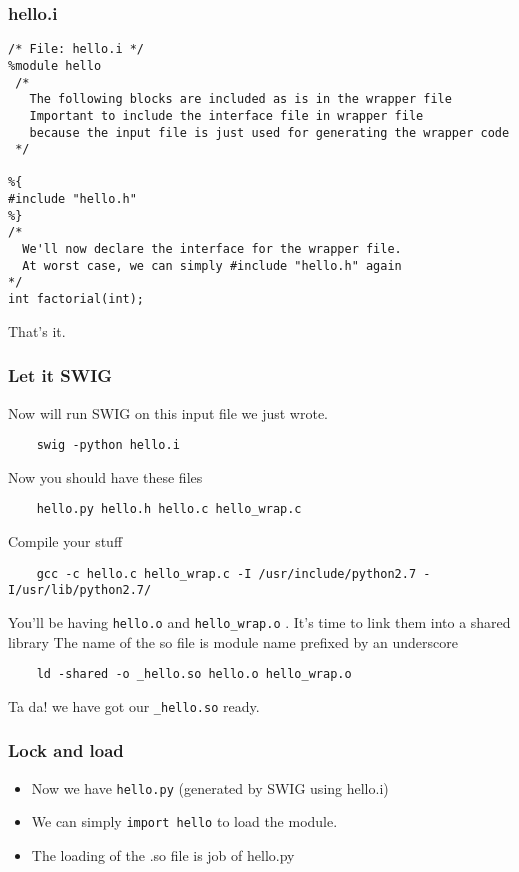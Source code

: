 \documentclass{beamer}
\begin{document}
\begin{frame}[fragile]
\frametitle{hello.i}
\label{sec-3_9}

\begin{verbatim}
/* File: hello.i */
%module hello
 /*
   The following blocks are included as is in the wrapper file
   Important to include the interface file in wrapper file
   because the input file is just used for generating the wrapper code
 */

%{
#include "hello.h"
%}
/*
  We'll now declare the interface for the wrapper file.
  At worst case, we can simply #include "hello.h" again
*/
int factorial(int);
\end{verbatim}
     That's it.
\end{frame}
\begin{frame}[fragile]
\frametitle{Let it SWIG}
\label{sec-3_10}

   Now will run SWIG on this input file we just wrote.
\begin{verbatim}
    swig -python hello.i
\end{verbatim}

   Now you should have these files
\begin{verbatim}
    hello.py hello.h hello.c hello_wrap.c
\end{verbatim}

   Compile your stuff
\begin{verbatim}
    gcc -c hello.c hello_wrap.c -I /usr/include/python2.7 -I/usr/lib/python2.7/
\end{verbatim}

   You'll be having \texttt{hello.o} and \texttt{hello\_wrap.o} . It's time to link them into a shared library
   The name of the so file is module name prefixed by an underscore
\begin{verbatim}
    ld -shared -o _hello.so hello.o hello_wrap.o
\end{verbatim}

   Ta da! we have got our \texttt{\_hello.so} ready.
\end{frame}
\begin{frame}
\frametitle{Lock and load}
\label{sec-3_11}


\begin{itemize}
\item Now we have \texttt{hello.py} (generated by SWIG using hello.i)
\item We can simply \texttt{import hello} to load the module.
\item The loading of the .so file is job of hello.py
\end{itemize}
\end{frame}
\end{document}
